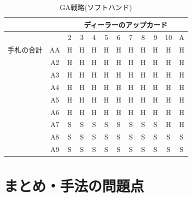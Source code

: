   \begin{table}[htbp]
    \centering
    \caption{GA戦略(ソフトハンド)\label{gastrategysoft}}
    \begin{tabular}{|c|c|c|c|c|c|c|c|c|c|c|c|}
      \hline
      \multicolumn{2}{|c|}{} & \multicolumn{10}{|c|}{ディーラーのアップカード} \\ \hline
      \multicolumn{2}{|c|}{} & 2 & 3 & 4 & 5 & 6 & 7 & 8 & 9 & 10 & A \\ \hline
      手札の合計 & AA & H & H & H & H & H & H & H & H & H & H \\ \cline{3-12}
                & A2 & H & H & H & H & H & H & H & H & H & H \\ \cline{3-12}
                & A3 & H & H & H & H & H & H & H & H & H & H \\ \cline{3-12}
                & A4 & H & H & H & H & H & H & H & H & H & H \\ \cline{3-12}
                & A5 & H & H & H & H & H & H & H & H & H & H \\ \cline{3-12}
                & A6 & H & H & H & H & H & H & H & H & H & H \\ \cline{3-12}
                & A7 & S & S & S & S & S & S & S & S & H & H \\ \cline{3-12}
                & A8 & S & S & S & S & S & S & S & S & S & S \\ \cline{3-12}
                & A9 & S & S & S & S & S & S & S & S & S & S \\ \hline
    \end{tabular}
  \end{table}


\section{まとめ・手法の問題点}